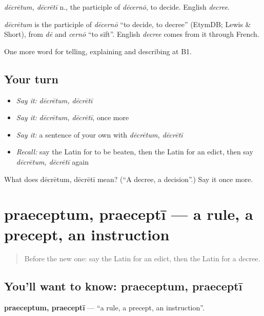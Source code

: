 \emph{dēcrētum, dēcrētī} n., the participle of \emph{dēcernō}, to decide. English \emph{decree}.

\begin{cousinweb}
\emph{dēcrētum} is the participle of \emph{dēcernō} \textquotedblleft{}to decide, to decree\textquotedblright{} (EtymDB; Lewis \& Short), from \emph{dē} and \emph{cernō} \textquotedblleft{}to sift\textquotedblright{}. English \emph{decree} comes from it through French.
\end{cousinweb}

\begin{grammarlens}[title={What you've built}]
One more word for telling, explaining and describing at B1.
\end{grammarlens}

\subsection*{Your turn}
\begin{itemize}
\raggedright
  \item \emph{Say it:} \emph{dēcrētum, dēcrētī}
  \item \emph{Say it:} \emph{dēcrētum, dēcrētī}, once more
  \item \emph{Say it:} a sentence of your own with \emph{dēcrētum, dēcrētī}
  \item \emph{Recall:} say the Latin for to be beaten, then the Latin for an edict, then say \emph{dēcrētum, dēcrētī} again
\end{itemize}

\begin{tcolorbox}[breakable,colback=teal!4,colframe=teal!35!black,title={Before you move on}]
What does dēcrētum, dēcrētī mean? (\textquotedblleft{}A decree, a decision\textquotedblright{}.) Say it once more.
\end{tcolorbox}
\section[praeceptum, praeceptī]{praeceptum, praeceptī — a rule, a precept, an instruction}

\label{lesson:LA-C409-praeceptum}



\begin{quote}
Before the new one: say the Latin for an edict, then the Latin for a decree.
\end{quote}

\subsection*{You'll want to know: praeceptum, praeceptī}
\textbf{praeceptum, praeceptī} — \textquotedblleft{}a rule, a precept, an instruction\textquotedblright{}.

